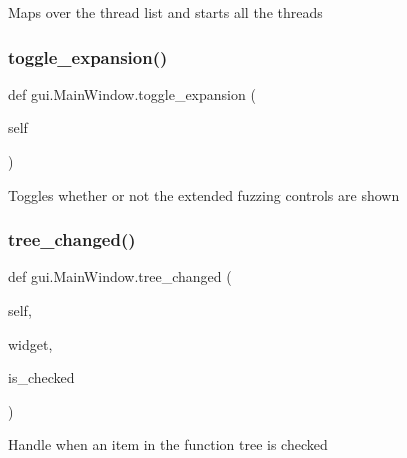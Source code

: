 \begin{DoxyVerb}Maps over the thread list and starts all the threads \end{DoxyVerb}
 \mbox{\label{classgui_1_1_main_window_a0b61220e5a6e085331551359824d81d3}} 
\subsubsection{\texorpdfstring{toggle\+\_\+expansion()}{toggle\_expansion()}}
{\footnotesize\ttfamily def gui.\+Main\+Window.\+toggle\+\_\+expansion (\begin{DoxyParamCaption}\item[{}]{self }\end{DoxyParamCaption})}

\begin{DoxyVerb}Toggles whether or not the extended fuzzing controls are shown \end{DoxyVerb}
 \mbox{\label{classgui_1_1_main_window_a554202478b3e837e8db563acfa955012}} 
\subsubsection{\texorpdfstring{tree\+\_\+changed()}{tree\_changed()}}
{\footnotesize\ttfamily def gui.\+Main\+Window.\+tree\+\_\+changed (\begin{DoxyParamCaption}\item[{}]{self,  }\item[{}]{widget,  }\item[{}]{is\+\_\+checked }\end{DoxyParamCaption})}

\begin{DoxyVerb}Handle when an item in the function tree is checked \end{DoxyVerb}
 \mbox{\label{classgui_1_1_main_window_ac07c4a00566c0b6d75850af87a35c4cb}} 
